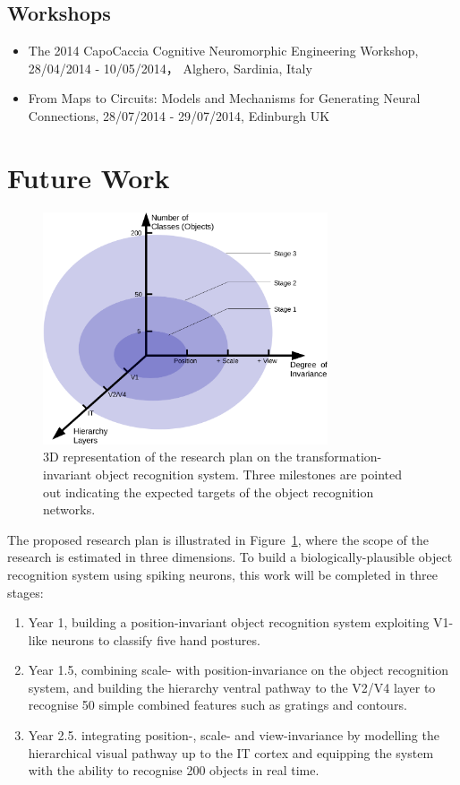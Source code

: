 \subsection{Workshops}
\begin{itemize}
	\item The 2014 CapoCaccia Cognitive Neuromorphic Engineering Workshop,\\ 28/04/2014 - 10/05/2014， Alghero, Sardinia, Italy 
	\item From Maps to Circuits: Models and Mechanisms for Generating Neural Connections, 28/07/2014 - 29/07/2014, Edinburgh UK
\end{itemize}
\section{Future Work} 
\begin{figure}[h!]
	\centering
	\includegraphics[width=0.75\textwidth]{pics/stages.png}
	\caption{3D representation of the research plan on the transformation-invariant object recognition system.
	Three milestones are pointed out indicating the expected targets of the object recognition networks.
	}
	\label{Fig:3Dplan}
\end{figure}
The proposed research plan is illustrated in Figure~\ref{Fig:3Dplan}, where the scope of the research is estimated in three dimensions.
To build a biologically-plausible object recognition system using spiking neurons, this work will be completed in three stages:
\begin{enumerate}
	\item Year 1, building a position-invariant object recognition system exploiting V1-like neurons to classify five hand postures. 
	\item Year 1.5, combining scale- with position-invariance on the object recognition system, and building the hierarchy ventral pathway to the V2/V4 layer to recognise 50 simple combined features such as gratings and contours.
	\item Year 2.5. integrating position-, scale- and view-invariance by modelling the hierarchical visual pathway up to the IT cortex and equipping the system with the ability to recognise 200 objects in real time.
\end{enumerate}
 
